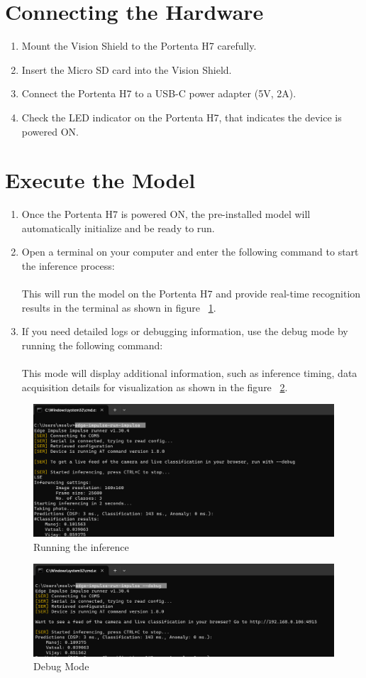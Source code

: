\section{Connecting the Hardware}
\begin{enumerate}
	\item Mount the Vision Shield to the Portenta H7 carefully.
	\item Insert the Micro SD card into the Vision Shield.
	\item Connect the Portenta H7 to a USB-C power adapter (5V, 2A).
	\item Check the LED indicator on the Portenta H7, that indicates the device is powered ON.
\end{enumerate}

\section{Execute the Model}

\begin{enumerate}
	\item Once the Portenta H7 is powered ON, the pre-installed model will automatically initialize and be ready to run.
	\item Open a terminal on your computer and enter the following command to start the inference process: \\ 
	\\This will run the model on the Portenta H7 and provide real-time recognition results in the terminal as shown in figure ~\ref{inference}.
	\item If you need detailed logs or debugging information, use the debug mode by running the following command:
	\\ 
	\\This mode will display additional information, such as inference timing, data acquisition details for visualization as shown in the figure ~\ref{debug}.
\end{enumerate}

\begin{figure}
	\begin{center}
		\includegraphics[width=0.7\linewidth]{Images/run_impulse.png}
		\caption{Running the inference}
		\label{inference}
	\end{center}
\end{figure}

\begin{figure}
	\begin{center}
		\includegraphics[width=0.7\linewidth]{Images/impulse_debug.png}
		\caption{Debug Mode}
		\label{debug}
	\end{center}
\end{figure}